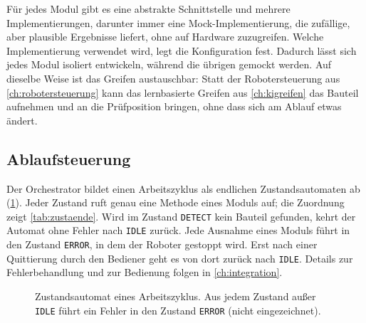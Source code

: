 Für jedes Modul gibt es eine abstrakte Schnittstelle und mehrere Implementierungen,
darunter immer eine Mock-Implementierung, die zufällige, aber plausible Ergebnisse liefert,
ohne auf Hardware zuzugreifen. Welche Implementierung verwendet wird, legt die Konfiguration fest.
Dadurch lässt sich jedes Modul isoliert entwickeln, während die übrigen gemockt werden.
Auf dieselbe Weise ist das Greifen austauschbar: Statt der Robotersteuerung aus
\cref{ch:robotersteuerung} kann das lernbasierte Greifen aus \cref{ch:kigreifen} das Bauteil
aufnehmen und an die Prüfposition bringen, ohne dass sich am Ablauf etwas ändert.

\subsection{Ablaufsteuerung}

Der Orchestrator bildet einen Arbeitszyklus als endlichen Zustandsautomaten ab
(\cref{fig:zustandsautomat}). Jeder Zustand ruft genau eine Methode eines Moduls auf; die
Zuordnung zeigt \cref{tab:zustaende}. Wird im Zustand \texttt{DETECT} kein Bauteil gefunden,
kehrt der Automat ohne Fehler nach \texttt{IDLE} zurück. Jede Ausnahme eines Moduls führt
in den Zustand \texttt{ERROR}, in dem der Roboter gestoppt wird. Erst nach einer Quittierung
durch den Bediener geht es von dort zurück nach \texttt{IDLE}. Details zur Fehlerbehandlung
und zur Bedienung folgen in \cref{ch:integration}.

\begin{figure}[htbp]
  \centering
  \caption{Zustandsautomat eines Arbeitszyklus. Aus jedem Zustand außer \texttt{IDLE} führt
           ein Fehler in den Zustand \texttt{ERROR} (nicht eingezeichnet).}
  \label{fig:zustandsautomat}
\end{figure}

